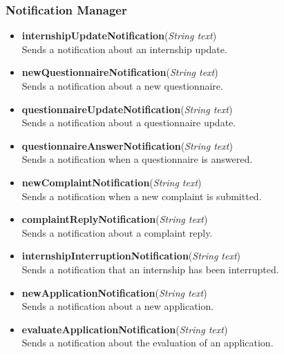 \subsubsection*{Notification Manager}
\begin{itemize}

    \item \textbf{internshipUpdateNotification}(\textit{String text}) \\
    Sends a notification about an internship update.

    \item \textbf{newQuestionnaireNotification}(\textit{String text}) \\
    Sends a notification about a new questionnaire.

    \item \textbf{questionnaireUpdateNotification}(\textit{String text}) \\
    Sends a notification about a questionnaire update.

    \item \textbf{questionnaireAnswerNotification}(\textit{String text}) \\
    Sends a notification when a questionnaire is answered.

    \item \textbf{newComplaintNotification}(\textit{String text}) \\
    Sends a notification when a new complaint is submitted.

    \item \textbf{complaintReplyNotification}(\textit{String text}) \\
    Sends a notification about a complaint reply.

    \item \textbf{internshipInterruptionNotification}(\textit{String text}) \\
    Sends a notification that an internship has been interrupted.

    \item \textbf{newApplicationNotification}(\textit{String text}) \\
    Sends a notification about a new application.

    \item \textbf{evaluateApplicationNotification}(\textit{String text}) \\
    Sends a notification about the evaluation of an application.

\end{itemize}

